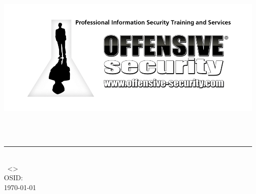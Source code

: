 
\begin{titlingpage}
  \begin{center}
    \includegraphics[scale=0.5]{images/cover_image.png}
  \end{center}
  \vspace{4cm}
  \begin{flushright}
    \Huge{\textsf{\reportTitle}}\\
    \large{\textsf{\reportSubtitle}}\\
    \rule{14cm}{0.4pt}\\
    \textsf{\authorName~<\authorMail>}\\
    \textsf{OSID: \authorOSID}\\
    \vspace*{\fill}
    \today
  \end{flushright}
\end{titlingpage}
